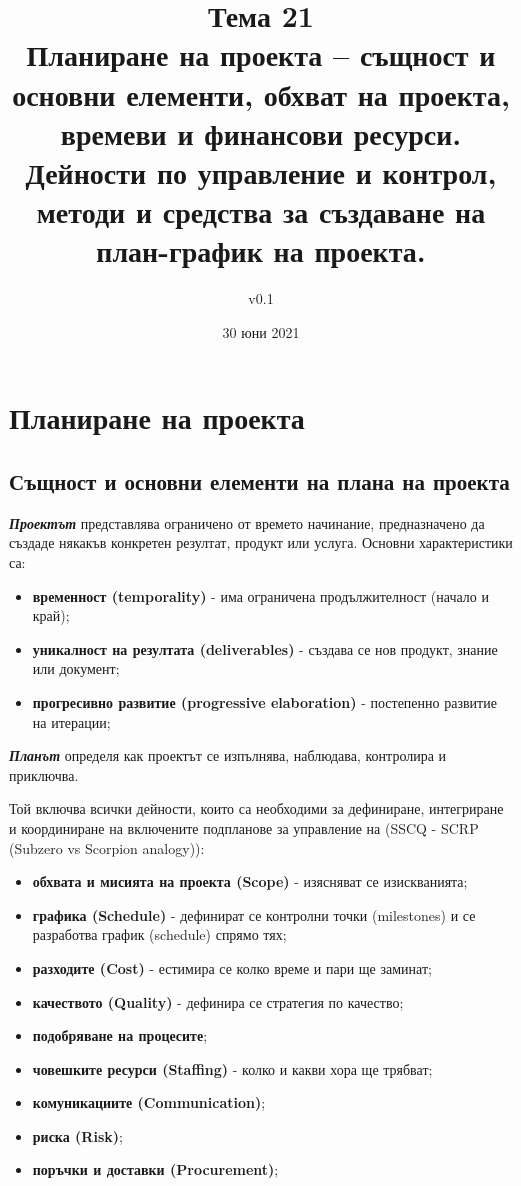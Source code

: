 \documentclass[fleqn,12pt]{article}
\title{Тема 21 \\Планиране на проекта – същност и основни елементи, обхват на проекта, времеви и финансови ресурси. Дейности по управление и контрол, методи и средства за създаване на план-график на проекта.}
\author{v0.1}
\date{30 юни 2021}
\begin{document}
\maketitle
\tableofcontents
\pagebreak

\section{Планиране на проекта}

\subsection{Същност и основни елементи на плана на проекта}

\textit{\textbf{Проектът}} представлява ограничено от времето начинание, предназначено да създаде някакъв конкретен резултат, продукт или услуга.
\bigbreak
Основни характеристики са:
\begin{itemize}
    \item \textbf{временност (temporality)} - има ограничена продължителност (начало и край);
    \item \textbf{уникалност на резултата (deliverables)} - създава се нов продукт, знание или документ;
    \item \textbf{прогресивно развитие (progressive elaboration)} - постепенно развитие на итерации;
\end{itemize}

\textit{\textbf{Планът}} определя как проектът се изпълнява, наблюдава, контролира и приключва.
\bigbreak

Той включва всички дейности, които са необходими за дефиниране, интегриране и координиране на включените подпланове за управление на (SSCQ - SCRP (Subzero vs Scorpion analogy)):
\begin{itemize}
    \item \textbf{обхвата и мисията на проекта (Scope)} - изясняват се изискванията;
    \item \textbf{графика (Schedule)} - дефинират се контролни точки (milestones) и се разработва график (schedule) спрямо тях;
    \item \textbf{разходите (Cost)} - естимира се колко време и пари ще заминат;
    \item \textbf{качеството (Quality)} - дефинира се стратегия по качество;
    \item \textbf{подобряване на процесите};
    \item \textbf{човешките ресурси (Staffing)} - колко и какви хора ще трябват;
    \item \textbf{комуникациите (Communication)};
    \item \textbf{риска (Risk)}; 
    \item \textbf{поръчки и доставки (Procurement)};
\end{itemize}
\end{document}
